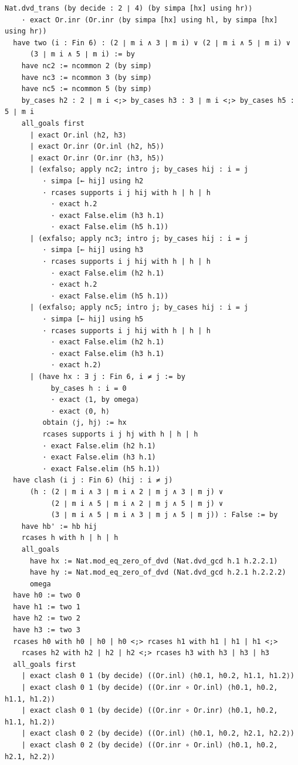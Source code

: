 \documentclass[11pt,a4paper]{article}
\begin{document}
\begin{Verbatim}[breaklines,breakanywhere,fontsize=\footnotesize]
        Nat.dvd_trans (by decide : 2 ∣ 4) (by simpa [hx] using hr)⟩
    · exact Or.inr (Or.inr ⟨by simpa [hx] using hl, by simpa [hx] using hr⟩)
  have two (i : Fin 6) : (2 ∣ m i ∧ 3 ∣ m i) ∨ (2 ∣ m i ∧ 5 ∣ m i) ∨
      (3 ∣ m i ∧ 5 ∣ m i) := by
    have nc2 := ncommon 2 (by simp)
    have nc3 := ncommon 3 (by simp)
    have nc5 := ncommon 5 (by simp)
    by_cases h2 : 2 ∣ m i <;> by_cases h3 : 3 ∣ m i <;> by_cases h5 : 5 ∣ m i
    all_goals first
      | exact Or.inl ⟨h2, h3⟩
      | exact Or.inr (Or.inl ⟨h2, h5⟩)
      | exact Or.inr (Or.inr ⟨h3, h5⟩)
      | (exfalso; apply nc2; intro j; by_cases hij : i = j
         · simpa [← hij] using h2
         · rcases supports i j hij with h | h | h
           · exact h.2
           · exact False.elim (h3 h.1)
           · exact False.elim (h5 h.1))
      | (exfalso; apply nc3; intro j; by_cases hij : i = j
         · simpa [← hij] using h3
         · rcases supports i j hij with h | h | h
           · exact False.elim (h2 h.1)
           · exact h.2
           · exact False.elim (h5 h.1))
      | (exfalso; apply nc5; intro j; by_cases hij : i = j
         · simpa [← hij] using h5
         · rcases supports i j hij with h | h | h
           · exact False.elim (h2 h.1)
           · exact False.elim (h3 h.1)
           · exact h.2)
      | (have hx : ∃ j : Fin 6, i ≠ j := by
           by_cases h : i = 0
           · exact ⟨1, by omega⟩
           · exact ⟨0, h⟩
         obtain ⟨j, hj⟩ := hx
         rcases supports i j hj with h | h | h
         · exact False.elim (h2 h.1)
         · exact False.elim (h3 h.1)
         · exact False.elim (h5 h.1))
  have clash (i j : Fin 6) (hij : i ≠ j)
      (h : (2 ∣ m i ∧ 3 ∣ m i ∧ 2 ∣ m j ∧ 3 ∣ m j) ∨
           (2 ∣ m i ∧ 5 ∣ m i ∧ 2 ∣ m j ∧ 5 ∣ m j) ∨
           (3 ∣ m i ∧ 5 ∣ m i ∧ 3 ∣ m j ∧ 5 ∣ m j)) : False := by
    have hb' := hb hij
    rcases h with h | h | h
    all_goals
      have hx := Nat.mod_eq_zero_of_dvd (Nat.dvd_gcd h.1 h.2.2.1)
      have hy := Nat.mod_eq_zero_of_dvd (Nat.dvd_gcd h.2.1 h.2.2.2)
      omega
  have h0 := two 0
  have h1 := two 1
  have h2 := two 2
  have h3 := two 3
  rcases h0 with h0 | h0 | h0 <;> rcases h1 with h1 | h1 | h1 <;>
    rcases h2 with h2 | h2 | h2 <;> rcases h3 with h3 | h3 | h3
  all_goals first
    | exact clash 0 1 (by decide) ((Or.inl) ⟨h0.1, h0.2, h1.1, h1.2⟩)
    | exact clash 0 1 (by decide) ((Or.inr ∘ Or.inl) ⟨h0.1, h0.2, h1.1, h1.2⟩)
    | exact clash 0 1 (by decide) ((Or.inr ∘ Or.inr) ⟨h0.1, h0.2, h1.1, h1.2⟩)
    | exact clash 0 2 (by decide) ((Or.inl) ⟨h0.1, h0.2, h2.1, h2.2⟩)
    | exact clash 0 2 (by decide) ((Or.inr ∘ Or.inl) ⟨h0.1, h0.2, h2.1, h2.2⟩)

\end{Verbatim}
\end{document}
